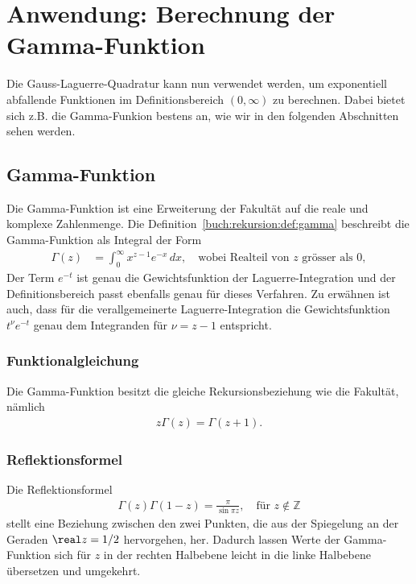 %
%
%
\section{Anwendung: Berechnung der Gamma-Funktion
  \label{laguerre:section:quad-gamma}}
Die Gauss-Laguerre-Quadratur kann nun verwendet werden,
um exponentiell abfallende Funktionen im Definitionsbereich $(0, \infty)$ zu
berechnen.
Dabei bietet sich z.B. die Gamma-Funkion bestens an, wie wir in den folgenden
Abschnitten sehen werden.

\subsection{Gamma-Funktion}
Die Gamma-Funktion ist eine Erweiterung der Fakultät auf die reale und komplexe
Zahlenmenge.
Die Definition~\ref{buch:rekursion:def:gamma} beschreibt die Gamma-Funktion als
Integral der Form
\begin{align}
\Gamma(z)
 & =
\int_0^\infty x^{z-1} e^{-x} \, dx
,
\quad
\text{wobei Realteil von $z$ grösser als $0$}
,
\label{laguerre:gamma}
\end{align}
Der Term $e^{-t}$ ist genau die Gewichtsfunktion der Laguerre-Integration und
der Definitionsbereich passt ebenfalls genau für dieses Verfahren.
Zu erwähnen ist auch, dass für die verallgemeinerte Laguerre-Integration die
Gewichtsfunktion $t^\nu e^{-t}$ genau dem Integranden für $\nu=z-1$ entspricht.

\subsubsection{Funktionalgleichung}
Die Gamma-Funktion besitzt die gleiche Rekursionsbeziehung wie die Fakultät,
nämlich
\begin{align}
z \Gamma(z)
=
\Gamma(z+1)
.
\label{laguerre:gamma_funktional}
\end{align}

\subsubsection{Reflektionsformel}
Die Reflektionsformel
\begin{align}
\Gamma(z) \Gamma(1 - z)
=
\frac{\pi}{\sin \pi z}
,\quad
\text{für }
z \notin \mathbb{Z}
\label{laguerre:gamma_refform}
\end{align}
stellt eine Beziehung zwischen den zwei Punkten,
die aus der Spiegelung an der Geraden $\real z = 1/2$ hervorgehen,
her.
Dadurch lassen Werte der Gamma-Funktion sich für $z$ in der rechten Halbebene
leicht in die linke Halbebene übersetzen und umgekehrt.


